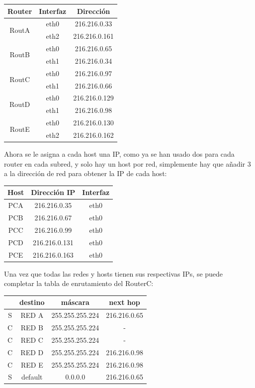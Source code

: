 \documentclass[12pt]{article}
\theoremstyle{definition}
\theoremstyle{remark}
\begin{document}
\begin{center}
\begin{tabular}{|c|c|c|}
\hline 
Router & Interfaz & Dirección \\ 
\hline 
\multirow{2}{*}{RoutA} & eth0 & 216.216.0.33 \\ 
  & eth2 & 216.216.0.161 \\ 
\hline 
\multirow{2}{*}{RoutB} & eth0 & 216.216.0.65 \\ 
 & eth1 & 216.216.0.34 \\ 
\hline 
\multirow{2}{*}{RoutC} & eth0 & 216.216.0.97 \\ 
 & eth1 & 216.216.0.66 \\ 
\hline 
\multirow{2}{*}{RoutD} & eth0 & 216.216.0.129 \\ 
 & eth1 & 216.216.0.98 \\ 
\hline 
\multirow{2}{*}{RoutE} & eth0 & 216.216.0.130 \\ 
 & eth2 & 216.216.0.162 \\ 
\hline 
\end{tabular} 
\end{center}

Ahora se le asigna a cada host una IP, como ya se han usado dos para cada router en cada subred, y solo hay un host por red, simplemente hay que añadir 3 a la dirección de red para obtener la IP de cada host:

\begin{center}
\begin{tabular}{|c|c|c|}
\hline 
Host & Dirección IP & Interfaz \\ 
\hline 
PCA &  216.216.0.35 & eth0 \\ 
\hline 
PCB & 216.216.0.67  & eth0 \\ 
\hline 
PCC &  216.216.0.99  & eth0\\ 
\hline 
PCD & 216.216.0.131   & eth0\\ 
\hline 
PCE & 216.216.0.163  & eth0 \\ 
\hline 
\end{tabular}
\end{center}

Una vez que todas las redes y hosts tienen sus respectivas IPs, se puede completar la tabla de enrutamiento del RouterC:

\begin{center}
\begin{tabular}{|c|c|c|c|}
\hline 
  & destino & máscara & next hop \\ 
\hline 
S & RED A & 255.255.255.224  &  216.216.0.65 \\ 
\hline 
C & RED B & 255.255.255.224  &  - \\ 
\hline 
C & RED C & 255.255.255.224  &  -  \\ 
\hline 
C & RED D & 255.255.255.224  &  216.216.0.98 \\ 
\hline 
C & RED E & 255.255.255.224  &  216.216.0.98 \\ 
\hline 
S & default & 0.0.0.0 & 216.216.0.65 \\ 
\hline 
\end{tabular}
\end{center}
\end{document}

